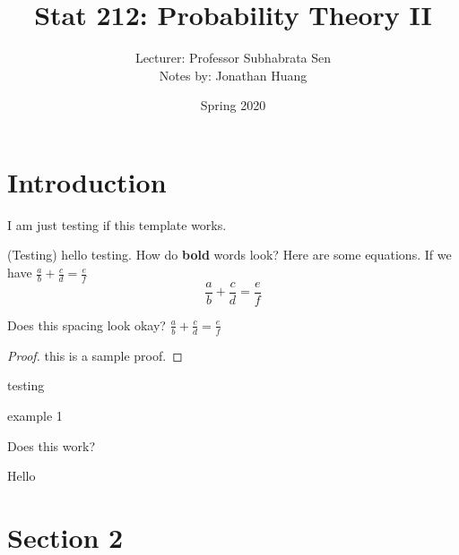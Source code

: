 \documentclass[12pt]{article}
\title{\textbf{Stat 212: Probability Theory II} \vspace{-0.5em}}
\author{Lecturer: Professor Subhabrata Sen \\
Notes by: Jonathan Huang \vspace{-1em}}
\date{Spring 2020}
\begin{document}
\maketitle
\hypersetup{linkcolor=blue}
\tableofcontents 

\newpage 

\section{Introduction}
I am just testing if this template works. 
\begin{theo}{(Testing)}
hello testing. How do \textbf{bold} words look? Here are some equations. If we have $\frac{a}{b} + \frac{c}{d} = \frac{e}{f}$
\[ \frac{a}{b} + \frac{c}{d} = \frac{e}{f}\]
\end{theo}

Does this spacing look okay? $\frac{a}{b} + \frac{c}{d} = \frac{e}{f}$

\begin{proof}
this is a sample proof.
\end{proof}

\begin{defn}{}
testing 
\end{defn}

\begin{ex}{}
example 1
\end{ex}

\begin{corol}{}

\end{corol}
Does this work? 
\begin{lem}{}

\end{lem}

\begin{prop}{}

\end{prop}

\remark Hello

\newpage 

\section{Section 2}
\end{document}
